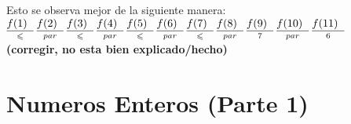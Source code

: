 \documentclass[a4paper,11pt]{article}
\begin{document}
Esto se observa mejor de la siguiente manera:\\
$\underset{\leqslant}{\underline{f(1)\hspace{0.2cm}}}\hspace{0.1cm}
\underset{par}{\underline{f(2)\hspace{0.2cm}}}\hspace{0.1cm}
\underset{\leqslant}{\underline{f(3)\hspace{0.2cm}}}\hspace{0.1cm}
\underset{par}{\underline{f(4)\hspace{0.2cm}}}\hspace{0.1cm}
\underset{\leqslant}{\underline{f(5)\hspace{0.2cm}}}\hspace{0.1cm}
\underset{par}{\underline{f(6)\hspace{0.2cm}}}\hspace{0.1cm}
\underset{\leqslant}{\underline{f(7)\hspace{0.2cm}}}\hspace{0.1cm}
\underset{par}{\underline{f(8)\hspace{0.2cm}}}\hspace{0.1cm}
\underset{7}{\underline{f(9)\hspace{0.2cm}}}\hspace{0.1cm}
\underset{par}{\underline{f(10)\hspace{0.2cm}}}\hspace{0.1cm}
\underset{6}{\underline{f(11)\hspace{0.2cm}}}\hspace{0.1cm}
$\\ \textbf{(corregir, no esta bien explicado/hecho)}

\section{Numeros Enteros (Parte 1)}
\end{document}
